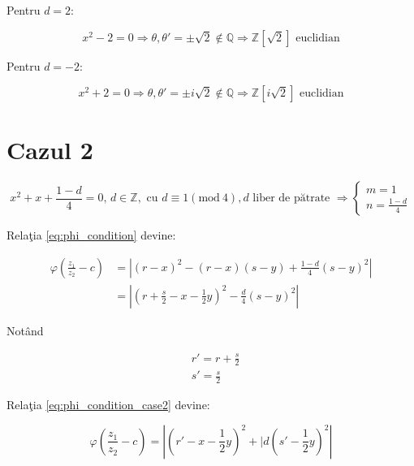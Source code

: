 \documentclass[12pt]{article}
\begin{document}
Pentru $d = 2$:

\begin{equation}
    x^2 - 2 = 0 \Rightarrow \theta, \theta' = \pm \sqrt{2} \notin \mathbb{Q} \Rightarrow \boxed{\mathbb{Z}[\sqrt{2}] \text{ euclidian}}
\end{equation}

Pentru $d = -2$:

\begin{equation}
    x^2 + 2 = 0 \Rightarrow \theta, \theta' = \pm i\sqrt{2} \notin \mathbb{Q} \Rightarrow \boxed{\mathbb{Z}[i\sqrt{2}] \text{ euclidian}}
\end{equation}

\section*{Cazul 2} 
\begin{equation} \label{eq:case_2}
x^2 + x + \frac{1 - d}{4} = 0, \, d \in \mathbb{Z},
\text{ cu } d \equiv 1 (\text{mod}\ 4), d \text{ liber de pătrate }
\Rightarrow \begin{cases} m = 1 \\ n = \frac{1-d}{4} \end{cases}
\end{equation}

Relaţia \eqref{eq:phi_condition} devine:

\begin{equation} \label{eq:phi_condition_case2}
\begin{split}
    \varphi \left(\frac{z_1}{z_2} - c\right)  &= \left| (r-x)^2 - (r-x)(s-y) + \frac{1-d}{4}(s-y)^2 \right| \\
    &= \left| \left(r + \frac{s}{2} - x - \frac{1}{2}y\right)^2 - \frac{d}{4}(s-y)^2 \right|
\end{split}
\end{equation}

Notând

\begin{equation}
\begin{split}
    & r' = r + \frac{s}{2} \\
    & s' = \frac{s}{2}
\end{split}
\end{equation}

Relaţia \eqref{eq:phi_condition_case2} devine:

\begin{equation} \label{eq:phi_condition_case2_subst}
    \varphi \left(\frac{z_1}{z_2} - c\right) =
    \left| \left(r' - x - \frac{1}{2}y \right) ^2  + |d \left(s' - \frac{1}{2}y\right)^2  \right|
\end{equation}
\end{document}
